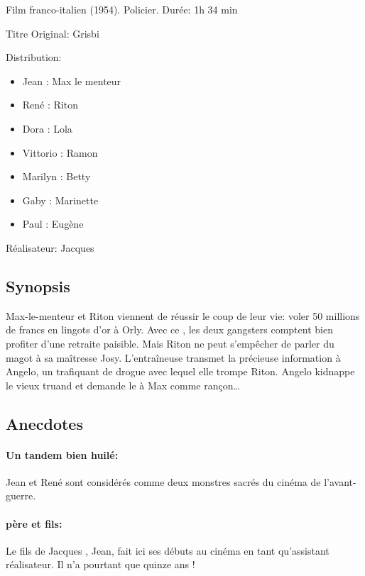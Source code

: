 Film franco-italien (1954). Policier. Durée: 1h 34 min

Titre Original: Grisbi

Distribution:

\begin{itemize}
	\item Jean : Max le menteur	
	\item René : Riton
	\item Dora : Lola	
	\item Vittorio : Ramon	
	\item Marilyn : Betty	
	\item Gaby : Marinette	
	\item Paul : Eugène
\end{itemize}

Réalisateur: Jacques 


\subsection*{Synopsis}

Max-le-menteur et Riton viennent de réussir le coup de leur vie: voler 50 millions de francs en lingots d'or à Orly. Avec ce , les deux gangsters comptent bien profiter d'une retraite paisible. Mais Riton ne peut s'empêcher de parler du magot à sa maîtresse Josy. L'entraîneuse transmet la précieuse information à Angelo, un trafiquant de drogue avec lequel elle trompe Riton. Angelo kidnappe le vieux truand et demande le  à Max comme rançon\dots{}


\subsection*{Anecdotes}

\paragraph{Un tandem bien huilé:} Jean  et René  sont considérés comme deux monstres sacrés du cinéma de l'avant-guerre.

\paragraph{ père et fils:} Le fils de Jacques , Jean, fait ici ses débuts au cinéma en tant qu'assistant réalisateur. Il n'a pourtant que quinze ans !

